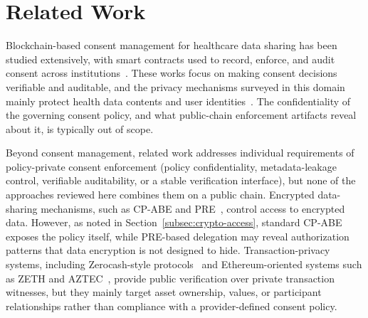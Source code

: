 \section{Related Work}
\label{sec:related-work}

Blockchain-based consent management for healthcare data sharing has been studied extensively, with smart contracts used to record, enforce, and audit consent across institutions~\cite{kakarlapudi2021systematic, welzel2025enabling,li2024you}.
These works focus on making consent decisions verifiable and auditable, and the privacy mechanisms surveyed in this domain mainly protect health data contents and user identities~\cite{li2025privacy}.
The confidentiality of the governing consent policy, and what public-chain enforcement artifacts reveal about it, is typically out of scope.

Beyond consent management, related work addresses individual requirements of policy-private consent enforcement (policy confidentiality, metadata-leakage control, verifiable auditability, or a stable verification interface), but none of the approaches reviewed here combines them on a public chain.
Encrypted data-sharing mechanisms, such as CP-ABE and PRE~\cite{bethencourt2007ciphertext,ateniese2006improved}, control access to encrypted data. However, as noted in Section~\ref{subsec:crypto-access}, standard CP-ABE exposes the policy itself, while PRE-based delegation may reveal authorization patterns that data encryption is not designed to hide.
Transaction-privacy systems, including Zerocash-style protocols~\cite{sasson2014zerocash} and Ethereum-oriented systems such as ZETH and AZTEC~\cite{rondelet2019zeth,williamson2018aztec}, provide public verification over private transaction witnesses, but they mainly target asset ownership, values, or participant relationships rather than compliance with a provider-defined consent policy.

